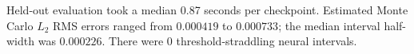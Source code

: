Held-out evaluation took a median 0.87 seconds per checkpoint. Estimated Monte Carlo $L_2$ RMS errors ranged from $0.000419$ to $0.000733$; the median interval half-width was $0.000226$. There were 0 threshold-straddling neural intervals.
